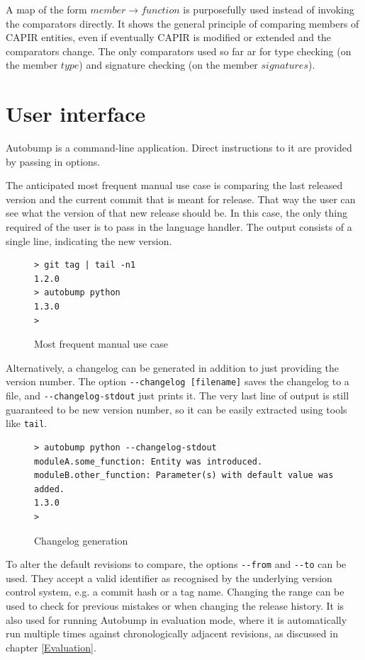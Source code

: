 \documentclass{l4proj}
\newcommand\genericstyle{\lstset{basicstyle=\ttm}}
\newcommand\codeinline[1]{{\genericstyle\lstinline!#1!}}
\begin{document}
A map of the form $member \rightarrow function$ is purposefully used
instead of invoking the comparators directly. It shows the general
principle of comparing members of CAPIR entities, even if eventually
CAPIR is modified or extended and the comparators change. The only
comparators used so far ar for type checking (on the member $type$)
and signature checking (on the member $signatures$).


\section{User interface}

Autobump is a command-line application. Direct instructions to it are
provided by passing in options.

The anticipated most frequent manual use case is comparing the last
released version and the current commit that is meant for release.
That way the user can see what the version of that new release should
be. In this case, the only thing required of the user is to pass in
the language handler. The output consists of a single line, indicating
the new version.

\begin{figure}[H]
\centering
\caption{Most frequent manual use case}
\begin{BVerbatim}
> git tag | tail -n1
1.2.0
> autobump python
1.3.0
>
\end{BVerbatim}
\end{figure}

Alternatively, a changelog can be generated in addition to just
providing the version number. The option \codeinline{--changelog
[filename]} saves the changelog to a file, and
\codeinline{--changelog-stdout} just prints it. The very last line of
output is still guaranteed to be new version number, so it can be
easily extracted using tools like \codeinline{tail}.

\begin{figure}[H]
\centering
\caption{Changelog generation}
\begin{BVerbatim}
> autobump python --changelog-stdout
moduleA.some_function: Entity was introduced.
moduleB.other_function: Parameter(s) with default value was added.
1.3.0
>
\end{BVerbatim}
\end{figure}

To alter the default revisions to compare, the options
\codeinline{--from} and \codeinline{--to} can be used. They accept a
valid identifier as recognised by the underlying version control
system, e.g. a commit hash or a tag name. Changing the range can be
used to check for previous mistakes or when changing the release
history. It is also used for running Autobump in evaluation mode,
where it is automatically run multiple times against chronologically
adjacent revisions, as discussed in chapter \ref{Evaluation}.
\end{document}
